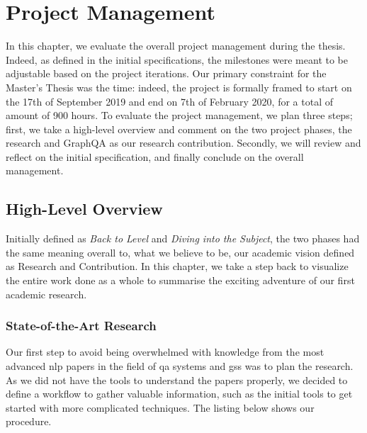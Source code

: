 \chapter{Project Management}
\label{chap:final-project-management}

In this chapter, we evaluate the overall project management during the thesis. Indeed, as defined in the initial specifications, the milestones were meant to be adjustable based on the project iterations. Our primary constraint for the Master's Thesis was the time: indeed, the project is formally framed to start on the 17th of September 2019 and end on 7th of February 2020, for a total of amount of 900 hours. To evaluate the project management, we plan three steps; first, we take a high-level overview and comment on the two project phases, the  research and GraphQA as our research contribution. Secondly, we will review and reflect on the initial specification, and finally conclude on the overall management.

\section{High-Level Overview}
Initially defined as \textit{Back to Level} and \textit{Diving into the Subject}, the two phases had the same meaning overall to, what we believe to be, our academic vision defined as Research and Contribution. In this chapter, we take a step back to visualize the entire work done as a whole to summarise the exciting adventure of our first academic research.

\subsection{State-of-the-Art Research}
Our first step to avoid being overwhelmed with knowledge from the most advanced \gls{nlp} papers in the field of \gls{qa} systems and \glspl{gs} was to plan the research.  As we did not have the tools to understand the papers properly, we decided to define a workflow to gather valuable information, such as the initial tools to get started with more complicated techniques. The listing below shows our procedure.

